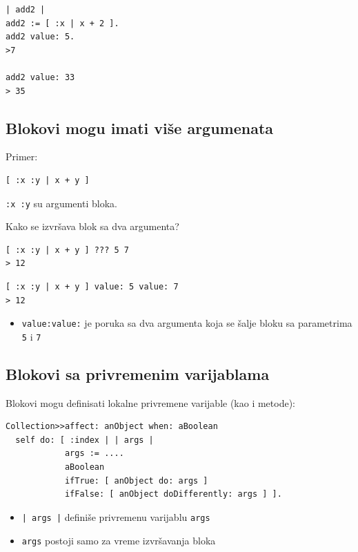 \documentclass[presentation]{beamer}
\begin{document}
\begin{verbatim}
| add2 |
add2 := [ :x | x + 2 ].
add2 value: 5.
>7

add2 value: 33
> 35
\end{verbatim}

\subsection{Blokovi mogu imati više argumenata}
\label{sec:orge13ad27}

Primer:

\begin{verbatim}
[ :x :y | x + y ]
\end{verbatim}

\texttt{:x :y} su argumenti bloka.

Kako se izvršava blok sa dva argumenta?

\begin{verbatim}
[ :x :y | x + y ] ??? 5 7
> 12
\end{verbatim}

\begin{verbatim}
[ :x :y | x + y ] value: 5 value: 7
> 12
\end{verbatim}

\begin{itemize}
\item \texttt{value:value:} je poruka sa dva argumenta koja se šalje bloku sa parametrima
\texttt{5} i \texttt{7}
\end{itemize}

\subsection{Blokovi sa privremenim varijablama}
\label{sec:org9cc0863}

Blokovi mogu definisati lokalne privremene varijable (kao i metode):

\begin{verbatim}
Collection>>affect: anObject when: aBoolean
  self do: [ :index | | args |
            args := ....
            aBoolean
            ifTrue: [ anObject do: args ]
            ifFalse: [ anObject doDifferently: args ] ].

\end{verbatim}

\begin{itemize}
\item \texttt{| args |} definiše privremenu varijablu \texttt{args}
\item \texttt{args} postoji samo za vreme izvršavanja bloka
\end{itemize}
\end{document}
